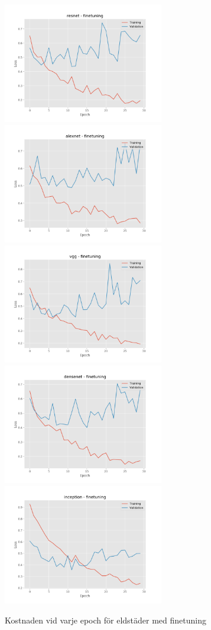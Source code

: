 \documentclass[]{kththesis}
\begin{document}
\begin{figure}[h]
  \includegraphics[width=7cm]{f_l_resnet_fine}
  \includegraphics[width=7cm]{f_l_alexnet_fine}
  \includegraphics[width=7cm]{f_l_vgg_fine}
  \includegraphics[width=7cm]{f_l_densenet_fine}
  \includegraphics[width=7cm]{f_l_inception_fine}
  \caption{Kostnaden vid varje epoch för eldstäder med finetuning}
  \label{fig:f_l_2}
\end{figure}
\end{document}
